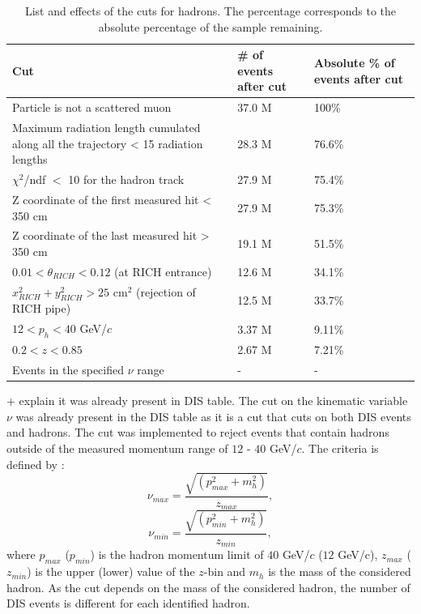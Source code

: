 \begin{table}[!h]
  \centering
  \caption{List and effects of the cuts for hadrons. The percentage corresponds to the absolute percentage of the sample remaining.}
  \label{pic:Hadroncuts}
  \begin{tabular}{p{10cm} p{2cm} p{2cm}}
    \hline
    \hline
     Cut & \# of events after cut & Absolute \% of events after cut  \\
    \hline
    \hline
    Particle is not a scattered muon & 37.0 M & 100\% \\
    Maximum radiation length cumulated along all the trajectory < 15 radiation lengths & 28.3 M & 76.6\% \\
    $\chi^2$/ndf $<$ 10 for the hadron track & 27.9 M & 75.4\% \\
    Z coordinate of the first measured hit < 350 cm & 27.9 M & 75.3\% \\
    Z coordinate of the last measured hit > 350 cm & 19.1 M & 51.5\% \\
    $0.01 < \theta_{RICH} < 0.12$ (at RICH entrance) & 12.6 M & 34.1\% \\
    $x^2_{RICH} + y^2_{RICH} > 25$ cm$^2$ (rejection of RICH pipe) & 12.5 M & 33.7\% \\
    $12 < p_h < 40$ GeV/$c$ & 3.37 M & 9.11\% \\
    $0.2 < z < 0.85$ & 2.67 M & 7.21\% \\
    Events in the specified $\nu$ range & - & - \\
    \hline
    \hline
  \end{tabular}
\end{table}

+ explain it was already present in DIS table.
The cut on the kinematic variable $\nu$ was already present in the DIS table as it is a cut that cuts on both DIS events and hadrons. The cut was implemented to reject events that contain hadrons outside of the measured momentum range of $12$ - $40$ GeV/$c$. The criteria is defined by :
%
\begin{equation}
  \nu_{max} = \frac{\sqrt{(p^2_{max}+m^2_h)}}{z_{max}},
\end{equation}
\begin{equation}
  \nu_{min} = \frac{\sqrt{(p^2_{min}+m^2_h)}}{z_{min}},
\end{equation}
%
where $p_{max}$ ($p_{min}$) is the hadron momentum limit of $40$ GeV/$c$ ($12$ GeV/c), $z_{max}$ ($z_{min}$) is the upper (lower) value of the $z$-bin and $m_h$ is the mass of the considered hadron. As the cut depends on the mass of the considered hadron, the number of DIS events is different for each identified hadron.

